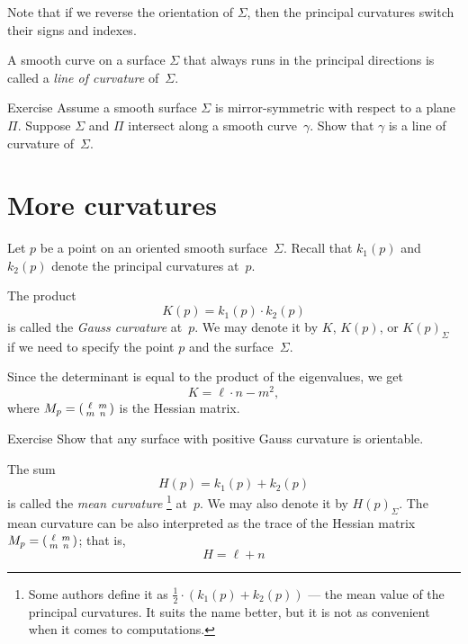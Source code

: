 Note that if we reverse the orientation of $\Sigma$, then the principal curvatures switch their signs and indexes.

A smooth curve on a surface $\Sigma$ that always runs in the principal directions is called a \emph{line of curvature} of~$\Sigma$. 

\begin{thm}{Exercise}\label{ex:line-of-curvature}
Assume a smooth surface $\Sigma$ is mirror-symmetric with respect to a plane $\Pi$.
Suppose $\Sigma$ and $\Pi$ intersect along a smooth curve~$\gamma$.
Show that $\gamma$ is a line of curvature of~$\Sigma$.
\end{thm}

\section{More curvatures}\label{sec:More curvatures}

Let $p$ be a point on an oriented smooth surface~$\Sigma$.
Recall that $k_1(p)$ and $k_2(p)$ denote the principal curvatures at~$p$.

The product 
\[K(p)=k_1(p)\cdot k_2(p)\]
is called the \emph{Gauss curvature} at~$p$.
We may denote it by $K$, $K(p)$, or $K(p)_\Sigma$ if we need to specify the point $p$ and the surface~$\Sigma$.

Since the determinant is equal to the product of the eigenvalues, we get
\[K=\ell\cdot n-m^2,\]
where 
$M_p\z=
(\begin{smallmatrix}
\ell&m
\\
m&n
\end{smallmatrix}
)
$ is the Hessian matrix.

\begin{thm}{Exercise}\label{ex:gauss+orientable}
Show that any surface with positive Gauss curvature is orientable. 
\end{thm}

The sum 
\[H(p)=k_1(p)+ k_2(p)\] 
is called the \emph{mean curvature}%
\footnote{Some authors define it as $\tfrac12\cdot(k_1(p)+ k_2(p))$ --- the mean value of the principal curvatures. It suits the name better, but it is not as convenient when it comes to computations.}
at~$p$.
We may also denote it by $H(p)_\Sigma$.
The mean curvature can be also interpreted as the trace of the Hessian matrix $M_p\z=
(\begin{smallmatrix}
\ell&m
\\
m&n
\end{smallmatrix}
)$;
that is,
\[H=\ell+n\] 

